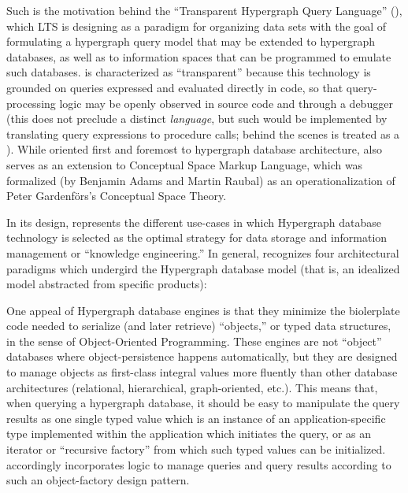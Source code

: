 \documentclass[11pt,letterpaper]{article}
\newcommand{\ATexttclr}[1]{\textcolor{tcolor}{\textbf{#1}}}
\newcommand{\THQL}{\resizebox{!}{7pt}{\ATexttclr{THQL}}}
\newcommand{\lTHQL}{\resizebox{!}{7.5pt}{\ATexttclr{T}}%
\resizebox{!}{7pt}{\ATexttclr{HQL}}}
\newcommand{\DSL}{\resizebox{!}{7pt}{\AcronymText{DSL}}}
\newcommand{\textscc}[1]{{\color{orr!35!black}{{%
						\fontfamily{Cabin-TLF}\fontseries{b}\selectfont{\textsc{\scriptsize{#1}}}}}}}
\newcommand{\AcronymText}[1]{{\textscc{#1}}}
\newcommand{\Cpp}{\resizebox{!}{7pt}{\AcronymText{C++}}}
\newcommand{\p}[1]{

\vspace{.7em}#1}
\newcommand{\q}[1]{{\fontfamily{qcr}\selectfont ``}#1{\fontfamily{qcr}\selectfont ''}}
\begin{document}
{\p{Such is the motivation behind the 
\q{Transparent Hypergraph Query Language} (\THQL{}), which LTS 
is designing as a paradigm for organizing data sets 
with the goal of formulating a hypergraph query model that 
may be extended to hypergraph databases, as well 
as to information spaces that can be programmed to 
emulate such databases.  \lTHQL{} is characterized as \q{transparent} 
because this technology is grounded on queries expressed 
and evaluated directly in \Cpp{} code, so that query-processing 
logic may be openly observed in source code and through a 
debugger (this does not preclude a distinct \THQL{} 
\textit{language}, but such would be implemented 
by translating query expressions to \Cpp{} procedure calls; 
behind the scenes \THQL{} is treated as a \Cpp{} \DSL{}).  
While oriented first and foremost to hypergraph database 
architecture, \THQL{} also serves as an extension 
to Conceptual Space Markup Language, which was 
formalized (by Benjamin Adams and Martin Raubal) 
as an operationalization of Peter Gardenf\"{o}rs's 
Conceptual Space Theory.}


\p{In its design, \THQL{} represents the different use-cases 
in which Hypergraph database technology is selected as the 
optimal strategy for data storage and information management 
or \q{knowledge engineering.}  In general, \THQL{} recognizes 
four architectural paradigms which undergird the Hypergraph database 
model (that is, an idealized model abstracted from specific products):

\begin{description}[itemsep=1pt]
\item[Object Serialization]  One appeal of Hypergraph database 
engines is that they minimize the biolerplate code needed to 
serialize (and later retrieve) \q{objects,} or typed data structures, 
in the sense of Object-Oriented Programming.  These engines are not 
\q{object} databases where object-persistence happens automatically, 
but they are designed to manage objects as first-class integral 
values more fluently than other database architectures 
(relational, hierarchical, graph-oriented, etc.).  This means 
that, when querying a hypergraph database, it should be 
easy to manipulate the query results as one single typed 
value which is an instance of an application-specific 
type implemented within the application which initiates 
the query, or as an iterator or \q{recursive factory} from which such 
typed values can be initialized.  \lTHQL{} accordingly incorporates 
logic to manage queries and query results according to such an 
object-factory design pattern.


\end{description}}}
\end{document}
